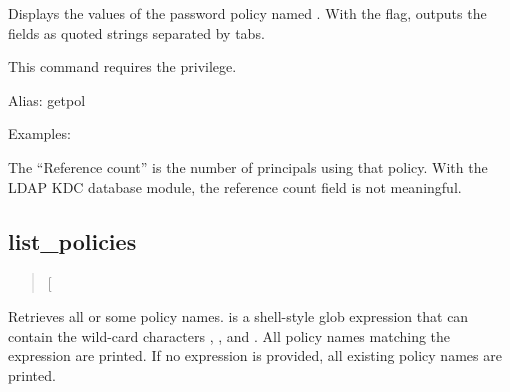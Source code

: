 \documentclass[letterpaper,10pt,english]{sphinxmanual}
\begin{document}
Displays the values of the password policy named .  With the
 flag, outputs the fields as quoted strings separated by
tabs.

This command requires the  privilege.

Alias: getpol

Examples:

%
\begin{sphinxVerbatim}[commandchars=\\\{\}]
  
 
     
   
   
      
     
  

   
                       
\end{sphinxVerbatim}

The “Reference count” is the number of principals using that policy.
With the LDAP KDC database module, the reference count field is not
meaningful.


\subsection{list\_policies}
\label{\detokenize{admin/database:list-policies}}\begin{quote}

 {[}\sphinxstyleemphasis{expression}{]}
\end{quote}

Retrieves all or some policy names.   is a shell-style
glob expression that can contain the wild-card characters ,
\sphinxcode{*}, and \sphinxcode{{[}{]}}.  All policy names matching the expression are
printed.  If no expression is provided, all existing policy names are
printed.
\end{document}

